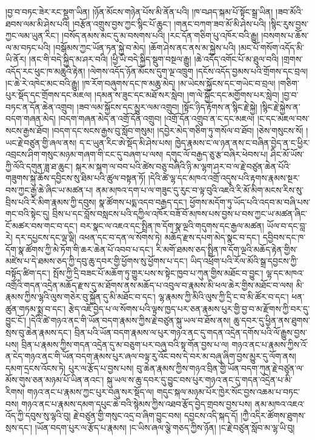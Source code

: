 \documentclass{article}
\begin{document}
།བྱ་བ་བཏང་ཟེར་རང་སྡུག་ཡིན། །ཉོན་མོངས་གཉེན་པོས་མི་ནོན་པའི། །ཁ་བཤད་སྐམ་པོ་སྟོང་སྒྲ་ཡིན། །ཟབ་མོའི་ཐབས་ལམ་མི་ཤེས་པའི། །བརྩོན་འགྲུས་བྱས་ཀྱང་སྙིང་པོ་ཆུང་། །གནང་བཀག་ཟབ་མོ་མི་ཤེས་པའི། །སྙིང་རུས་བྱས་ཀྱང་ལམ་ཡུན་རིང་། །བསོད་ནམས་མང་དུ་མ་བསགས་པའི། །རང་དོན་གཅིག་པུ་འཁོར་བའི་རྒྱུ། །བསགས་པ་ཆོས་ལ་མ་བཏང་པའི། །བསྒོམས་ཀྱང་ཡོན་ཏན་སྐྱེ་བ་མེད། །ཆོག་ཤེས་ནང་ནས་མ་སྐྱེས་པའི། །མང་པོ་གསོག་འདོད་མི་ཡི་ནོར། །ནང་གི་བདེ་སྐྱིད་མ་ཤར་བའི། །ཕྱི་ཡི་བདེ་སྐྱིད་སྡུག་བསྔལ་རྒྱུ། །ཆེ་འདོད་འགོང་པོ་མ་ཐུལ་བའི། །གྲགས་འདོད་རང་ཕུང་ཁ་མཆུའི་རྟེན། །ལེགས་འདོད་ཉོན་མོངས་དུག་ལྔ་འཁྲུག །དངོས་འདོད་བྱམས་པའི་གྲོགས་དང་བྲལ། །ང་ཆེ་རེ་འཁེང་མང་བའི་རྒྱུ། །ཁ་རོག་བཞུགས་དང་ཁ་མཆུ་མེད། །མ་ཡེངས་སྐྱོངས་དང་གཡེང་བ་བྲལ། །གཅིག་པུར་སྡོད་དང་གྲོགས་དང་མཇལ། །དམན་ས་ཟུང་དང་མཐོ་སར་སླེབ། །ག་ལེ་སྐྱོང་དང་མགྱོགས་པར་སླེབ། །བྱ་བ་བཏང་ན་དོན་ཆེན་འགྲུབ། །ཟབ་ལམ་སྐྱོངས་དང་མྱུར་ལམ་འགྲུབ། །སྟོང་ཉིད་རྟོགས་ན་སྙིང་རྗེ་སྐྱེ། །སྙིང་རྗེ་སྐྱེས་ན་བདག་གཞན་མེད། །བདག་གཞན་མེད་ན་འགྲོ་དོན་འགྲུབ། །འགྲོ་དོན་འགྲུབ་ན་ང་དང་མཇལ། །ང་དང་མཇལ་བས་སངས་རྒྱས་ཐོབ། །བདག་དང་སངས་རྒྱས་བུ་སློབ་གསུམ། །དབྱེར་མེད་གཅིག་ཏུ་གསོལ་བ་ཐོབ། །ཅེས་གསུངས་སོ། །ཡང་རྗེ་བཙུན་གྱི་ཞལ་ནས། ད་ང་ཡུན་རིང་ཨེ་སྡོད་མི་ཤེས་པས། ཁྱེད་རྣམས་ང་ལ་ཉན་ནས་ང་བཞིན་བྱེད་ན་ང་ཕྱིར་འབྲངས་ཤིག་གསུང་མཉམ་གཞག་གི་ངང་དུ་བཞག་པ་ལས། དགུང་ལོ་བརྒྱད་ཅུ་རྩ་བཞིར་ཕེབས་པ། ཤིང་མོ་ཡོས་ཀྱི་ལོའི་དགུན་ཟླ་ཐ་ཆུང་། སྐར་མ་སྐག་ལ་བབ་པའི་ཚེས་བཅུ་བཞིའི་ཉི་མ་ལྷག་ཤར་བ་ལ་རྗེ་བཙུན་ཆེན་པོའི་གཟུགས་སྐུ་ཆོས་དབྱིངས་སུ་ཐིམ་པའི་ཚུལ་བསྟན་ཏོ། །དེའི་ཚེ་ལྷ་དང་མཁའ་འགྲོ་འདུས་པའི་རྟགས་རྣམས་སྔར་བས་ཀྱང་རྒྱ་ཆེ་ཞིང་ཡ་མཚན་པ། ནམ་མཁའ་དག་པ་ལ་གཟུང་དུ་རུང་བ་ལྟ་བུའི་འཇའི་རི་མོ་མིག་མངས་རིས་སུ་བྲིས་པའི་རེ་མིག་རྣམས་ཀྱི་དབུས། སྣ་ཚོགས་པདྨ་འདབ་བརྒྱད་དང་། ཕྱོགས་མདོག་ཏུ་ཡོད་པའི་འདབ་མ་བཞི་པས་གང་བའི་སྟེང་དུ། བྲིས་པ་དང་བློས་བསླངས་པའི་དཀྱིལ་འཁོར་བཟོ་བོ་མཁས་པས་བྱས་པ་བས་ཀྱང་ཡ་མཚན་ཞིང་ངོ་མཚར་བས་གང་བ་དང་། བར་སྣང་ལ་འཇའ་དང་སྤྲིན་ཁ་དོག་སྣ་ལྔའི་གདུགས་དང་རྒྱལ་མཚན། ཡོལ་བ་དང་བླ་རེ། དར་དཔྱངས་དང་ལྡ་ལྡི། འཕན་དང་བ་དན་ལ་སོགས་ཏེ། མཆོད་རྫས་དཔག་མེད་སྣང་བ་དང་། དབྱིབས་དང་ཁ་དོག་སྣ་ཚོགས་ཀྱི་མེ་ཏོག་གི་ཆར་ཆེན་པོ་འབབ་པ་དང་། རི་མགོ་ཐམས་ཅད་སྤྲིན་ཁ་དོག་ལྔའི་མཆོད་རྟེན་གྱིས་མཛེས་པ་དེ་ཐམས་ཅད་ཀྱི་དབུ་ཆུ་དབར་གྱི་ཕྱོགས་སུ་ཕྱོགས་པ་དང་། ཡིད་འཕྲོག་པའི་རོལ་མོའི་སྒྲ་དབྱངས་ཀྱི་བསྟོད་ཚིག་དང་། སྤོས་ཀྱི་དྲི་བཟང་པོ་མཆོག་ཏུ་གྱུར་པས་ས་སྟེང་ཁྱབ་པ་ཀུན་གྱིས་མཐོང་བ་བྱུང་། ལྷ་དང་མཁའ་འགྲོའི་གདན་འདྲེན་མཆོད་རྫས་དུ་མ་ཐོགས་ནས་མཆོད་པ་འབུལ་བ་རྣམས་མི་ཕལ་ཆེར་གྱིས་མཐོང་བ་ལས། མི་རྣམས་ཀྱིས་ལྷའི་ལུས་གཅེར་བུ་སྐྱོན་དུ་མི་མཐོང་བ་དང་། ལྷ་རྣམས་ཀྱི་མིའི་ལུས་ཀྱི་དྲི་ང་བ་མི་ཚོར་བ་དང་། ཕན་ཚུན་གཏམ་སྨྲ་བ་དང་། རྩེད་འཇོ་བྱེད་པ་ལ་སོགས་པའི་ལྟས་ཁྱད་པར་ཅན་རྣམས་པུར་གྱི་བྱ་བ་མ་རྫོགས་ཀྱི་བར་དུ་བྱུང་ངོ་། །དེའི་ཚེ་གཉའ་ནང་གི་ཡོན་བདག་རྣམས་ཀྱིས་རྗེ་བཙུན་སྐུ་ཡལ་བ་ཐོས་ནས། ཆུ་དབར་དུ་ཕྱིན་ནས་ཐུགས་སྲས་བུ་ཆེན་རྣམས་དང་། བྲིན་པའི་ཡོན་བདག་རྣམས་ལ་པུར་གཉའ་ནང་དུ་གདན་འདྲེན་དགོས་པའི་ལོ་རྒྱུས་བྱས་པས། བྲིན་པ་རྣམས་ཀྱིས་གདན་འདྲེན་དུ་མ་བཅུག་པར་བཞུ་བའི་སྟ་གོན་བྱས་པ་ལ། གཉའ་ནང་པ་རྣམས་ཀྱིས་འོ་ན་ངེད་གཉའ་ནང་གི་ཡོན་བདག་རྣམས་པུར་ཞལ་བལྟ་རུ་འོང་བས་དེ་བར་མ་བཞུ་ཞིག་བྱས་མྱུར་དུ་ལོག་ནས། དམག་དྲངས་འོངས་ཏེ། པུར་ལ་རྩོད་པ་བྱས་པས། བུ་ཆེན་རྣམས་ཀྱིས་གཉའ་བྲིན་གྱི་ཡོན་བདག་ཀུན་རྗེ་བཙུན་ལ་མོས་གུས་ཅན་མཉམ་པོ་ཡིན་ནའང་། སྐུ་ཡལ་ས་ཆུ་དབར་དུ་བྱུང་བས་པུར་གཉའ་ནང་དུ་གདན་འདྲེན་པ་མི་རིགས། གཉའ་ནང་པ་རྣམས་ཀྱང་པུར་བཞུ་སར་སྡོད་ལ། གདུང་སྐལ་མཉམ་པོར་ཁྱེར་སོང་བྱས་འཆམ་པ་བཏང་བས། གཉའ་ནང་པ་རྣམས་དམག་དཔུང་ཆེ་བའི་སྙེམས་ཀྱིས་འཐབ་རྩོད་བྱེད་གྲབས་བྱས་པས། ནམ་མཁའ་འཇའ་འོད་ཀྱི་དབུས་སུ་ལྷའི་བུ། རྗེ་བཙུན་གྱི་གསུང་འདྲ་བ་ཞིག་བྱུང་བས། དབྱངས་འདི་སྐད་དོ། །ཀྱཻ་འདིར་ཚོགས་ཐུགས་སྲས་དང་། །ཡོན་བདག་པུར་ལ་རྩོད་པ་རྣམས། །ང་ཡིས་ཞལ་ལྕེ་གཅད་ཀྱིས་ཉོན། །ང་རྗེ་བཙུན་སློབ་མ་ལྷ་ཡི་བུ། 
\end{document}
